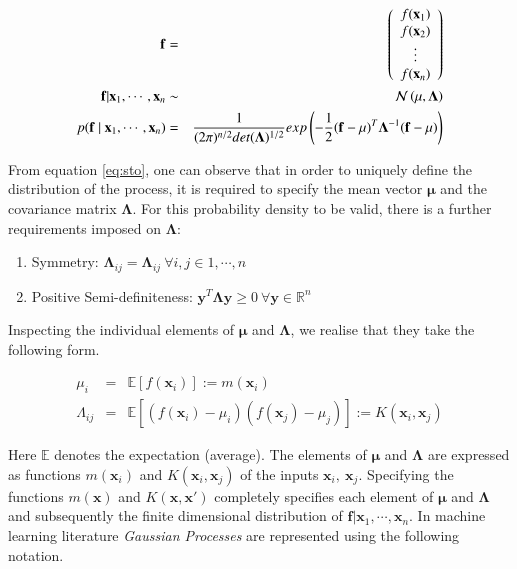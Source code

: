 \documentclass[referee,a4paper,12pt,traditabstract]{swsc}
\begin{document}
\begin{linenumbers}
\begin{eqnarray}
 \mathbf{f} & = & \left( \begin{array}{c} f(\mathbf{x}_1) \\ f(\mathbf{x}_2) \\ \vdots \\ f(\mathbf{x}_n) \end{array} \right) \\
 \vspace{2\baselineskip}
 \mathbf{f} | \mathbf{x}_1, \cdots, \mathbf{x}_n & \sim & \mathcal{N}\left( \mathbf{\mu}, \mathbf{\Lambda} \right)  \\
 \vspace{2\baselineskip}
 p( \mathbf{f} \ | \ \mathbf{x}_1, \cdots, \mathbf{x}_n) & = & \frac{1}{(2\pi)^{n/2} det(\mathbf{\Lambda})^{1/2}} exp \left(-\frac{1}{2} (\mathbf{f} - \mathbf{\mu})^T \mathbf{\Lambda}^{-1} (\mathbf{f} - \mathbf{\mu}) \right) \label{eq:sto}
\end{eqnarray}

From equation \ref{eq:sto}, one can observe that in order to uniquely define the distribution of the process, it is required to specify the mean vector $\mathbf{\mu}$ and the covariance matrix $\mathbf{\Lambda}$. For this probability density to be valid, there is a further requirements imposed on $\mathbf{\Lambda}$: 

\begin{enumerate}
      \item Symmetry: $\mathbf{\Lambda}_{ij} = \mathbf{\Lambda}_{ij} \ \forall i,j \in {1, \cdots, n} $ 
      \item Positive Semi-definiteness: $\mathbf{y}^T \mathbf{\Lambda} \mathbf{y} \geq 0 \ \forall \mathbf{y} \in \mathbb{R}^n$  
\end{enumerate}

Inspecting the individual elements of $\mathbf{\mu}$ and $\mathbf{\Lambda}$, we realise that they take the following form.

\begin{eqnarray}
      \mu_i & = & \mathbb{E}[f(\mathbf{x}_i)] := m(\mathbf{x}_i) \\
      \Lambda_{ij} & = & \mathbb{E}[(f(\mathbf{x}_i) - \mu_i)(f(\mathbf{x}_j) - \mu_j)] := K(\mathbf{x}_i, \mathbf{x}_j)
\end{eqnarray}

Here $\mathbb{E}$ denotes the expectation (average). The elements of $\mathbf{\mu}$ and $\mathbf{\Lambda}$ are expressed as functions $m(\mathbf{x}_i)$ and $K(\mathbf{x}_i, \mathbf{x}_j)$ of the inputs $\mathbf{x}_i,\ \mathbf{x}_j$. Specifying the functions $m(\mathbf{x})$ and $K(\mathbf{x}, \mathbf{x}')$ completely specifies each element of $\mathbf{\mu}$ and $\mathbf{\Lambda}$ and subsequently the finite dimensional distribution of $\mathbf{f} | \mathbf{x}_1, \cdots, \mathbf{x}_n $. In machine learning literature \emph{Gaussian Processes} are represented using the following notation.


\end{linenumbers}
\end{document}
